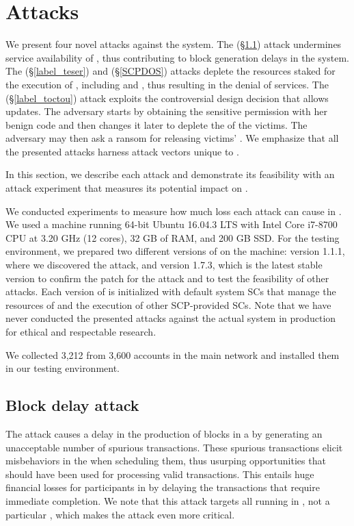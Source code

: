 \chapter{Attacks}

We present four novel attacks against the \eos system. The \NODEDOS
(\S\ref{label_reentrancy-attack}) attack undermines service availability of \BPs,
thus contributing to block generation delays in the \eos system.
%
The \TESER (\S\ref{label_teser}) and \SCPDOS (\S\ref{SCPDOS}) attacks deplete the
resources staked for the execution of \SCs, including \cpu and \ram, thus
resulting in the denial of \SC services.
%
The \TOCTOU (\S\ref{label_toctou}) attack exploits the controversial \EOS design
decision that allows \SC updates. The adversary starts by obtaining the
sensitive permission with her benign \SC code and then changes it later to
deplete the \ram of the victims. The adversary may then ask a ransom for
releasing victims' \ram.
%
We emphasize that all the presented attacks harness attack vectors unique to
\eos.

In this section, we describe each attack and demonstrate its feasibility with an
attack experiment that measures its potential impact on \PLATFORM.
%

We conducted experiments to measure how much loss each attack can cause in
\PLATFORM. We used a machine running 64-bit Ubuntu 16.04.3 LTS with Intel Core
i7-8700 CPU at 3.20 GHz (12 cores), 32 GB of RAM, and 200 GB SSD.
%
For the testing environment, we prepared two different versions of \eos on the
machine: version 1.1.1, where we discovered the \NODEDOS attack, and version
1.7.3, which is the latest stable version to confirm the patch for the \NODEDOS
attack and to test the feasibility of other attacks.
%
Each version of \eos is initialized with default system SCs that manage the
resources of \eos and the execution of other SCP-provided SCs.
%
Note that we have never conducted the presented attacks against the actual \eos
system in production for ethical and respectable research.

We collected 3,212 \SCs from 3,600 accounts in the \eos main network
and installed them in our testing environment.





\section{Block delay attack}
\label{label_reentrancy-attack}
The \NODEDOS attack causes a delay in the production of blocks in a \BP by
generating an unacceptable number of spurious transactions. These spurious
transactions elicit misbehaviors in the \BP when scheduling them, thus usurping
opportunities that should have been used for processing valid transactions.
This entails huge financial losses for participants in \PLATFORM by delaying
the transactions that require immediate completion.
%
We note that this attack targets all \SCs running in \BPs, not a
particular \SC, which makes the attack even more critical.

